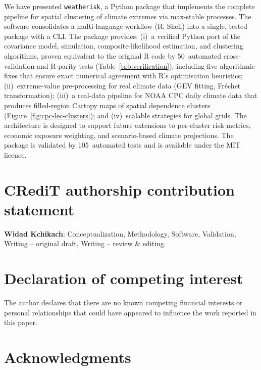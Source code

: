 \documentclass[a4paper]{elsarticle}
\begin{document}
We have presented \texttt{weatherisk}, a Python package that implements
the complete pipeline for spatial clustering of climate extremes via
max-stable processes.
The software consolidates a multi-language workflow (R, Shell) into a
single, tested package with a CLI.
The package provides:
(i)~a verified Python port of the covariance model, simulation,
    composite-likelihood estimation, and clustering algorithms,
    proven equivalent to the original R code by 50~automated
    cross-validation and R-parity tests
    (Table~\ref{tab:verification}), including five algorithmic
    fixes that ensure exact numerical agreement with R's
    optimisation heuristics;
(ii)~extreme-value pre-processing for real climate data (GEV fitting,
    Fr\'{e}chet transformation);
(iii)~a real-data pipeline for NOAA CPC daily climate data that produces
     filled-region Cartopy maps of spatial dependence clusters
     (Figure~\ref{fig:cpc-lec-clusters}); and
(iv)~scalable strategies for global grids.
The architecture is designed to support future extensions to
per-cluster risk metrics, economic exposure weighting, and
scenario-based climate projections.
The package is validated by 105~automated tests and is available
under the MIT licence.

\section*{CRediT authorship contribution statement}

\textbf{Widad Kchikach}: Conceptualization, Methodology, Software,
Validation, Writing -- original draft, Writing -- review \& editing.

\section*{Declaration of competing interest}

The author declares that there are no known competing financial interests
or personal relationships that could have appeared to influence the work
reported in this paper.

\section*{Acknowledgments}
\end{document}
